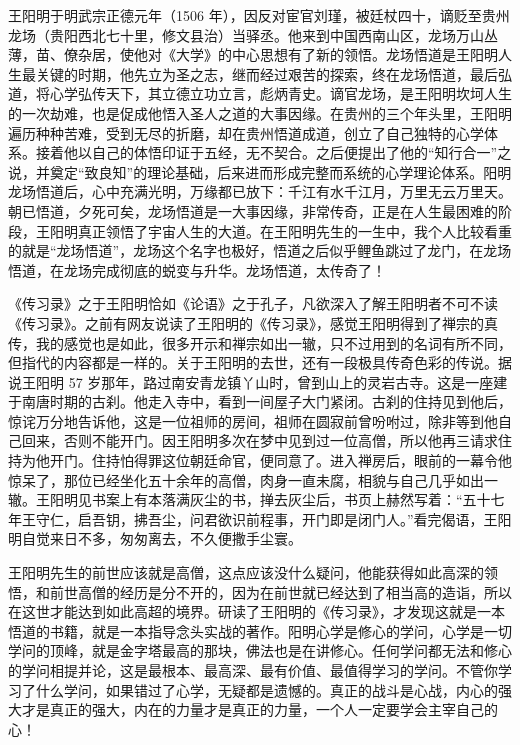 王阳明于明武宗正德元年（1506 年），因反对宦官刘瑾，被廷杖四十，谪贬至贵州龙场（贵阳西北七十里，修文县治）当驿丞。他来到中国西南山区，龙场万山丛薄，苗、僚杂居，使他对《大学》的中心思想有了新的领悟。龙场悟道是王阳明人生最关键的时期，他先立为圣之志，继而经过艰苦的探索，终在龙场悟道，最后弘道，将心学弘传天下，其立德立功立言，彪炳青史。谪官龙场，是王阳明坎坷人生的一次劫难，也是促成他悟入圣人之道的大事因缘。在贵州的三个年头里，王阳明遍历种种苦难，受到无尽的折磨，却在贵州悟道成道，创立了自己独特的心学体系。接着他以自己的体悟印证于五经，无不契合。之后便提出了他的“知行合一”之说，并奠定“致良知”的理论基础，后来进而形成完整而系统的心学理论体系。阳明龙场悟道后，心中充满光明，万缘都已放下：千江有水千江月，万里无云万里天。朝已悟道，夕死可矣，龙场悟道是一大事因缘，非常传奇，正是在人生最困难的阶段，王阳明真正领悟了宇宙人生的大道。在王阳明先生的一生中，我个人比较看重的就是“龙场悟道”，龙场这个名字也极好，悟道之后似乎鲤鱼跳过了龙门，在龙场悟道，在龙场完成彻底的蜕变与升华。龙场悟道，太传奇了！

《传习录》之于王阳明恰如《论语》之于孔子，凡欲深入了解王阳明者不可不读《传习录》。之前有网友说读了王阳明的《传习录》，感觉王阳明得到了禅宗的真传，我的感觉也是如此，很多开示和禅宗如出一辙，只不过用到的名词有所不同，但指代的内容都是一样的。关于王阳明的去世，还有一段极具传奇色彩的传说。据说王阳明 57 岁那年，路过南安青龙镇丫山时，曾到山上的灵岩古寺。这是一座建于南唐时期的古刹。他走入寺中，看到一间屋子大门紧闭。古刹的住持见到他后，惊诧万分地告诉他，这是一位祖师的房间，祖师在圆寂前曾吩咐过，除非等到他自己回来，否则不能开门。因王阳明多次在梦中见到过一位高僧，所以他再三请求住持为他开门。住持怕得罪这位朝廷命官，便同意了。进入禅房后，眼前的一幕令他惊呆了，那位已经坐化五十余年的高僧，肉身一直未腐，相貌与自己几乎如出一辙。王阳明见书案上有本落满灰尘的书，掸去灰尘后，书页上赫然写着：“五十七年王守仁，启吾钥，拂吾尘，问君欲识前程事，开门即是闭门人。”看完偈语，王阳明自觉来日不多，匆匆离去，不久便撒手尘寰。

王阳明先生的前世应该就是高僧，这点应该没什么疑问，他能获得如此高深的领悟，和前世高僧的经历是分不开的，因为在前世就已经达到了相当高的造诣，所以在这世才能达到如此高超的境界。研读了王阳明的《传习录》，才发现这就是一本悟道的书籍，就是一本指导念头实战的著作。阳明心学是修心的学问，心学是一切学问的顶峰，就是金字塔最高的那块，佛法也是在讲修心。任何学问都无法和修心的学问相提并论，这是最根本、最高深、最有价值、最值得学习的学问。不管你学习了什么学问，如果错过了心学，无疑都是遗憾的。真正的战斗是心战，内心的强大才是真正的强大，内在的力量才是真正的力量，一个人一定要学会主宰自己的心！

